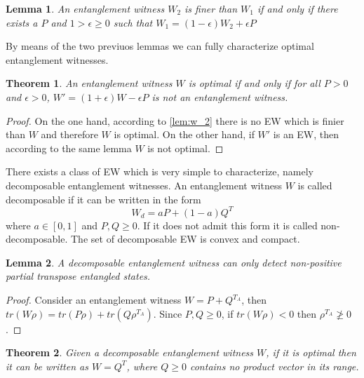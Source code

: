 \documentclass[10pt,a4paper]{book}
\numberwithin{equation}{chapter}
\numberwithin{figure}{chapter}
\numberwithin{table}{chapter}
\newtheorem{theorem}{Theorem}[section]
\newtheorem{lemma}{Lemma}[section]
\begin{document}
\begin{lemma} An entanglement witness $W_2$ is finer than $W_1$ if and only if there exists a $P$ and $1> \epsilon \geq 0$ such that $W_1=(1-\epsilon)W_2 +\epsilon P$
\label{lem:w_2}
\end{lemma}
By means of the two previuos lemmas we can fully characterize optimal entanglement witnesses.
\begin{theorem} An entanglement witness $W$ is optimal if and only if for all $P>0$ and $\epsilon >0$, $W'=(1+\epsilon)W -\epsilon P$ is not an entanglement witness.
\end{theorem}
\begin{proof}
On the one hand, according to \autoref{lem:w_2} there is no EW which is finier than $W$ and therefore $W$ is optimal. On the other hand, if $W'$ is an EW, then according to the same lemma $W$ is not optimal.
\end{proof}

There exists a class of EW which is very simple to characterize, namely decomposable entanglement witnesses. An entanglement witness $W$ is called decomposable if it can be written in the form
\begin{equation}
W_d = aP + (1-a)Q^{T} 
\end{equation}
where $a\in [0,1]$ and $P,Q \geq 0$. If it does not admit this form it is called non-decomposable. The set of decomposable EW is convex and compact.
\begin{lemma} A decomposable entanglement witness can only detect non-positive partial transpose entangled states.
\end{lemma}
\begin{proof} Consider an entanglement witness $W=P+Q^{T_A}$, then $tr(W\rho)=tr(P\rho)+tr(Q\rho^{T_A})$. Since $P,Q \geq 0$, if $tr(W\rho)<0$ then $\rho^{T_A}\ngeq 0$.
\end{proof}
\begin{theorem} Given a decomposable entanglement witness $W$, if it is optimal then it can be written as $W=Q^T$, where $Q\geq 0$ contains no product vector in its range.
\end{theorem}
\end{document}
